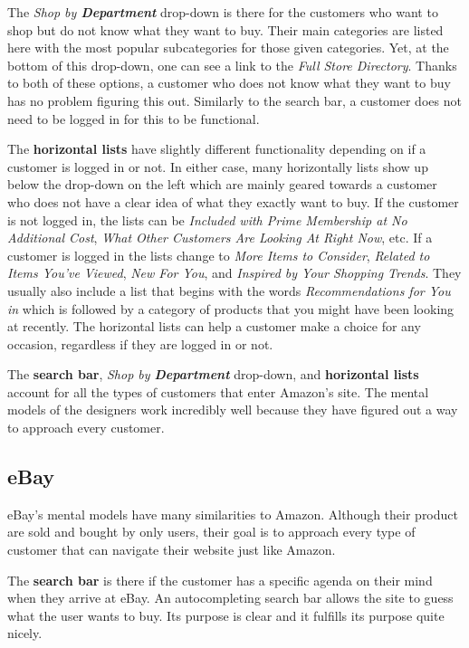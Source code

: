 \documentclass[11pt, oneside]{article}
\begin{document}
	The \textit{Shop by \textbf{Department}} drop-down is there for the customers who want to shop but do not know what they want to buy. Their main categories are listed here with the most popular subcategories for those given categories. Yet, at the bottom of this drop-down, one can see a link to the \textit{Full Store Directory}. Thanks to both of these options, a customer who does not know what they want to buy has no problem figuring this out. Similarly to the search bar, a customer does not need to be logged in for this to be functional.

	The \textbf{horizontal lists} have slightly different functionality depending on if a customer is logged in or not. In either case, many horizontally lists show up below the drop-down on the left which are mainly geared towards a customer who does not have a clear idea of what they exactly want to buy. If the customer is not logged in, the lists can be \textit{Included with Prime Membership at No Additional Cost}, \textit{What Other Customers Are Looking At Right Now}, etc. If a customer is logged in the lists change to \textit{More Items to Consider}, \textit{Related to Items You've Viewed}, \textit{New For You}, and \textit{Inspired by Your Shopping Trends}. They usually also include a list that begins with the words \textit{Recommendations for You in} which is followed by a category of products that you might have been looking at recently. The horizontal lists can help a customer make a choice for any occasion, regardless if they are logged in or not.

	The \textbf{search bar}, \textit{Shop by \textbf{Department}} drop-down, and \textbf{horizontal lists} account for all the types of customers that enter Amazon's site. The mental models of the designers work incredibly well because they have figured out a way to approach every customer.

	\subsection{eBay}

	eBay's mental models have many similarities to Amazon. Although their product are sold and bought by only users, their goal is to approach every type of customer that can navigate their website just like Amazon.

	The \textbf{search bar} is there if the customer has a specific agenda on their mind when they arrive at eBay. An autocompleting search bar allows the site to guess what the user wants to buy. Its purpose is clear and it fulfills its purpose quite nicely.
\end{document}
